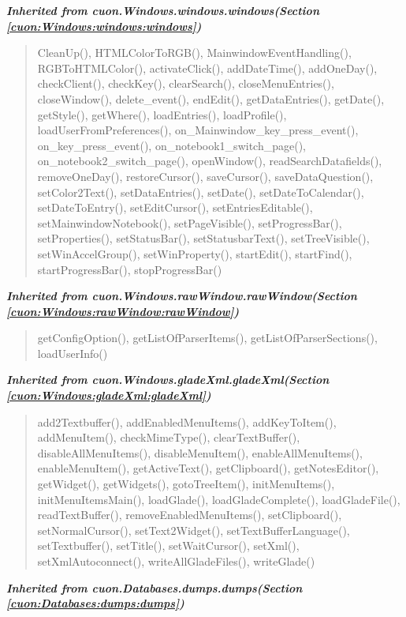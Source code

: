 \large{\textbf{\textit{Inherited from cuon.Windows.windows.windows\textit{(Section \ref{cuon:Windows:windows:windows})}}}}

\begin{quote}
CleanUp(), HTMLColorToRGB(), MainwindowEventHandling(), RGBToHTMLColor(), activateClick(), addDateTime(), addOneDay(), checkClient(), checkKey(), clearSearch(), closeMenuEntries(), closeWindow(), delete\_event(), endEdit(), getDataEntries(), getDate(), getStyle(), getWhere(), loadEntries(), loadProfile(), loadUserFromPreferences(), on\_Mainwindow\_key\_press\_event(), on\_key\_press\_event(), on\_notebook1\_switch\_page(), on\_notebook2\_switch\_page(), openWindow(), readSearchDatafields(), removeOneDay(), restoreCursor(), saveCursor(), saveDataQuestion(), setColor2Text(), setDataEntries(), setDate(), setDateToCalendar(), setDateToEntry(), setEditCursor(), setEntriesEditable(), setMainwindowNotebook(), setPageVisible(), setProgressBar(), setProperties(), setStatusBar(), setStatusbarText(), setTreeVisible(), setWinAccelGroup(), setWinProperty(), startEdit(), startFind(), startProgressBar(), stopProgressBar()
\end{quote}

\large{\textbf{\textit{Inherited from cuon.Windows.rawWindow.rawWindow\textit{(Section \ref{cuon:Windows:rawWindow:rawWindow})}}}}

\begin{quote}
getConfigOption(), getListOfParserItems(), getListOfParserSections(), loadUserInfo()
\end{quote}

\large{\textbf{\textit{Inherited from cuon.Windows.gladeXml.gladeXml\textit{(Section \ref{cuon:Windows:gladeXml:gladeXml})}}}}

\begin{quote}
add2Textbuffer(), addEnabledMenuItems(), addKeyToItem(), addMenuItem(), checkMimeType(), clearTextBuffer(), disableAllMenuItems(), disableMenuItem(), enableAllMenuItems(), enableMenuItem(), getActiveText(), getClipboard(), getNotesEditor(), getWidget(), getWidgets(), gotoTreeItem(), initMenuItems(), initMenuItemsMain(), loadGlade(), loadGladeComplete(), loadGladeFile(), readTextBuffer(), removeEnabledMenuItems(), setClipboard(), setNormalCursor(), setText2Widget(), setTextBufferLanguage(), setTextbuffer(), setTitle(), setWaitCursor(), setXml(), setXmlAutoconnect(), writeAllGladeFiles(), writeGlade()
\end{quote}

\large{\textbf{\textit{Inherited from cuon.Databases.dumps.dumps\textit{(Section \ref{cuon:Databases:dumps:dumps})}}}}

